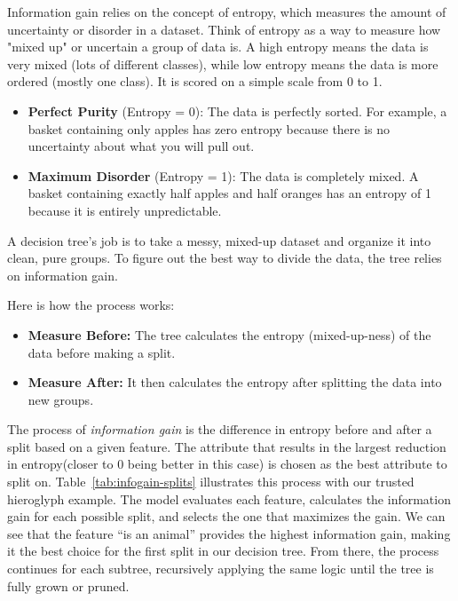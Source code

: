 Information gain relies on the concept of entropy, which measures the amount of uncertainty or disorder in a dataset. 
Think of entropy as a way to measure how "mixed up" or uncertain a group of data is. 
A high entropy means the data is very mixed (lots of different classes), while low entropy means the data is more ordered (mostly one class).
It is scored on a simple scale from 0 to 1. 

\begin{itemize}
  \item \textbf{Perfect Purity} (Entropy = 0): The data is perfectly sorted. For example, a basket containing only apples has zero entropy because there is no uncertainty about what you will pull out.
  \item \textbf{Maximum Disorder} (Entropy = 1): The data is completely mixed. A basket containing exactly half apples and half oranges has an entropy of 1 because it is entirely unpredictable.
\end{itemize}

A decision tree's job is to take a messy, mixed-up dataset and organize it into clean, pure groups. To figure out the best way to divide the data, the tree relies on information gain.

Here is how the process works:

\begin{itemize}
  \item \textbf{Measure Before:} The tree calculates the entropy (mixed-up-ness) of the data before making a split.
  \item \textbf{Measure After:} It then calculates the entropy after splitting the data into new groups.
\end{itemize}

The process of \textit{information gain} is the difference in entropy before and after a split based on a given feature. 
The attribute that results in the largest reduction in entropy(closer to 0 being better in this case) is chosen as the best attribute to split on. 
Table~\ref{tab:infogain-splits} illustrates this process with our trusted hieroglyph example. 
The model evaluates each feature, calculates the information gain for each possible split, and selects the one that maximizes the gain.
We can see that the feature ``is an animal'' provides the highest information gain, making it the best choice for the first split in our decision tree.
From there, the process continues for each subtree, recursively applying the same logic until the tree is fully grown or pruned.

